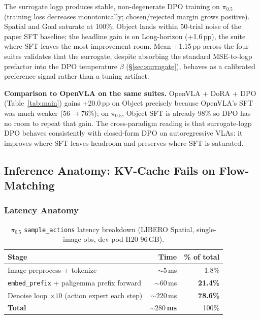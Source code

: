 \documentclass{article}
\begin{document}
The surrogate logp produces stable, non-degenerate DPO training on \(\pi_{0.5}\) (training loss decreases monotonically; chosen/rejected margin grows positive). Spatial and Goal saturate at 100\%; Object lands within 50-trial noise of the paper SFT baseline; the headline gain is on Long-horizon (+1.6\,pp), the suite where SFT leaves the most improvement room. Mean +1.15\,pp across the four suites validates that the surrogate, despite absorbing the standard MSE-to-logp prefactor into the DPO temperature \(\beta\) (\S\ref{sec:surrogate}), behaves as a calibrated preference signal rather than a tuning artifact.

\textbf{Comparison to OpenVLA on the same suites.} OpenVLA + DoRA + DPO (Table~\ref{tab:main}) gains +20.0\,pp on Object precisely because OpenVLA's SFT was much weaker (56\(\rightarrow\)76\%); on \(\pi_{0.5}\), Object SFT is already 98\% so DPO has no room to repeat that gain. The cross-paradigm reading is that surrogate-logp DPO behaves consistently with closed-form DPO on autoregressive VLAs: it improves where SFT leaves headroom and preserves where SFT is saturated.

\subsection{Inference Anatomy: KV-Cache Fails on Flow-Matching}\label{sec:kvcache}

\subsubsection*{Latency Anatomy}

\begin{table}[ht]
\centering
\caption{\(\pi_{0.5}\) \texttt{sample\_actions} latency breakdown (LIBERO Spatial, single-image obs, dev pod H20 96\,GB).}
\begin{tabular}{lrr}
\toprule
Stage & Time & \% of total \\
\midrule
Image preprocess + tokenize & \(\sim 5\)\,ms & 1.8\% \\
\texttt{embed\_prefix} + paligemma prefix forward & \(\sim 60\)\,ms & \textbf{21.4\%} \\
Denoise loop \(\times 10\) (action expert each step) & \(\sim 220\)\,ms & \textbf{78.6\%} \\
\midrule
\textbf{Total} & \textbf{\(\sim 280\)\,ms} & 100\% \\
\bottomrule
\end{tabular}
\end{table}
\end{document}
